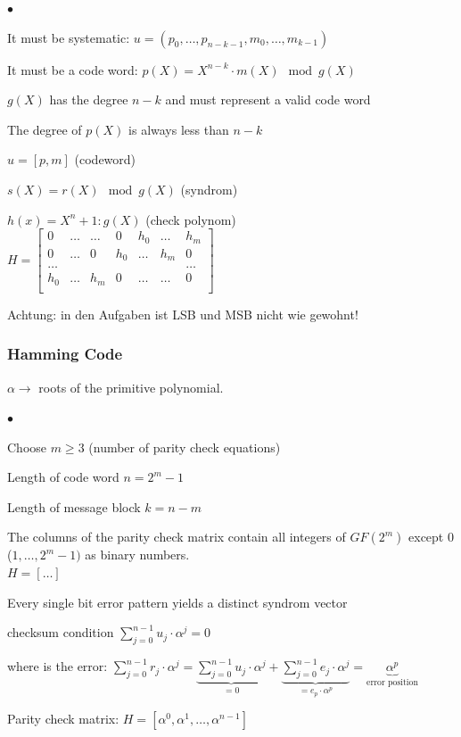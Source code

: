 \begin{list}{$\bullet$}{\setlength{\itemsep}{0cm} \setlength{\parsep}{0cm} \setlength{\topsep}{0.1cm}} 
  \item	It must be systematic: $u=(p_0,\ldots, p_{n-k-1}, m_0,\ldots,m_{k-1})$
  \item It must be a code word: $p(X)=X^{n-k}\cdot m(X) \mod g(X)$ \\
  \item $g(X)$ has the degree $n-k$ and must represent a valid code word
  \item The degree of $p(X)$ is always less than $n-k$
  \item $u=[p,m]$ (codeword)
  \item $s(X)=r(X)\mod g(X)$ (syndrom)
  \item $h(x)=X^n+1 : g(X)$ (check polynom)\\
        $H=\begin{bmatrix} 	
        			0	& \ldots	& \ldots	& 0 	& h_0		&	\ldots	&	h_m \\
        			0	& \ldots	& 0			& h_0	& \ldots	&	h_m		&	0	\\
        			\ldots &		&			&		&			&			&	\ldots \\
        			h_0	&	\ldots	& h_m		& 0		&	\ldots	&	\ldots	& 	0 \\
        \end{bmatrix}$  \\   
\end{list}
Achtung: in den Aufgaben ist LSB und MSB nicht wie gewohnt!\\

\subsubsection{Hamming Code}
$\alpha \to$ roots of the primitive polynomial.\\
\begin{list}{$\bullet$}{\setlength{\itemsep}{0cm} \setlength{\parsep}{0cm} \setlength{\topsep}{0.1cm}} 
  \item Choose $m \geq 3$ (number of parity check equations)
  \item Length of code word $n=2^m-1$
  \item Length of message block $k=n-m$
  \item The columns of the parity check matrix contain all integers of $GF(2^m)$ except 0 ($1, \ldots, 2^m-1)$ as binary numbers. \\
		$H=[\ldots] $
  \item Every single bit error pattern yields a distinct syndrom vector
  \item checksum condition $\displaystyle\sum_{j=0}^{n-1}u_j \cdot \alpha^j = 0$
  \item where is the error:
  		$\displaystyle\sum_{j=0}^{n-1}r_j \cdot \alpha^j = \underbrace{\displaystyle\sum_{j=0}^{n-1}u_j \cdot \alpha^j}_{=0} + \underbrace{\displaystyle\sum_{j=0}^{n-1}e_j \cdot \alpha^j}_{=e_p \cdot \alpha^p}= \underbrace{\alpha^p}_{\text{error position}}$
  \item Parity check matrix: $H=[\alpha^0, \alpha^1, \ldots , \alpha^{n-1}]$

\end{list}

